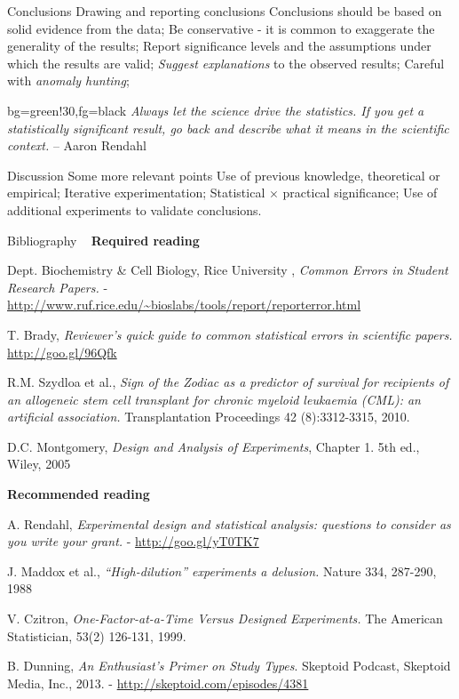 \documentclass[t]{beamer}
\begin{document}
\begin{ftst}
{Conclusions}
{Drawing and reporting conclusions}
\bitems Conclusions should be based on solid evidence from the data;
	\spitem Be conservative - it is common to exaggerate the generality of the results;
	\spitem Report significance levels and the assumptions under which the results are valid;
	\spitem \textit{Suggest explanations} to the observed results;
	\spitem Careful with \textit{anomaly hunting};
\eitem

\begin{colorblock}{}{bg=green!30,fg=black}
	\small\textit{Always let the science drive the statistics. If you get a statistically significant result, go back and describe what it means in the scientific context.}
	\flushright\small -- Aaron Rendahl
\end{colorblock}
\end{ftst}

\begin{ftst}
{Discussion}
 {Some more relevant points}
\bitems Use of previous knowledge, theoretical or empirical;
	\spitem Iterative experimentation;
	\spitem Statistical $\times$ practical significance;
	\spitem Use of additional experiments to validate conclusions.
\eitem
\end{ftst}



\begin{ftst}
{Bibliography}
{\ }
\scriptsize
\textbf{Required reading}

\benums Dept. Biochemistry \& Cell Biology, Rice University , \textit{Common Errors in Student Research Papers.} - {\tiny\url{http://www.ruf.rice.edu/~bioslabs/tools/report/reporterror.html}}
\item T. Brady, \textit{Reviewer's quick guide to common statistical errors in scientific papers.}\\
{\tiny\url{http://goo.gl/96Qfk}}
\item R.M. Szydloa et al., \textit{Sign of the Zodiac as a predictor of survival for recipients of an allogeneic stem cell transplant for chronic myeloid leukaemia (CML): an artificial association.} Transplantation Proceedings 42 (8):3312-3315, 2010.
\item D.C. Montgomery, \textit{Design and Analysis of Experiments}, Chapter 1. 5th ed., Wiley, 2005
\eenum

\textbf{Recommended reading}

\benums A. Rendahl, \textit{Experimental design and statistical analysis: questions to consider as you write your grant.} - {\tiny\url{http://goo.gl/yT0TK7}}
\item J. Maddox et al., \textit{``High-dilution'' experiments a delusion.} Nature 334, 287-290, 1988
\item V. Czitron, \textit{One-Factor-at-a-Time Versus Designed Experiments.} The American Statistician, 53(2) 126-131, 1999.
\item B. Dunning, \textit{An Enthusiast's Primer on Study Types}. Skeptoid Podcast, Skeptoid Media, Inc., 2013. - 
{\tiny\url{http://skeptoid.com/episodes/4381}}

\eenum
\end{ftst}
\end{document}
